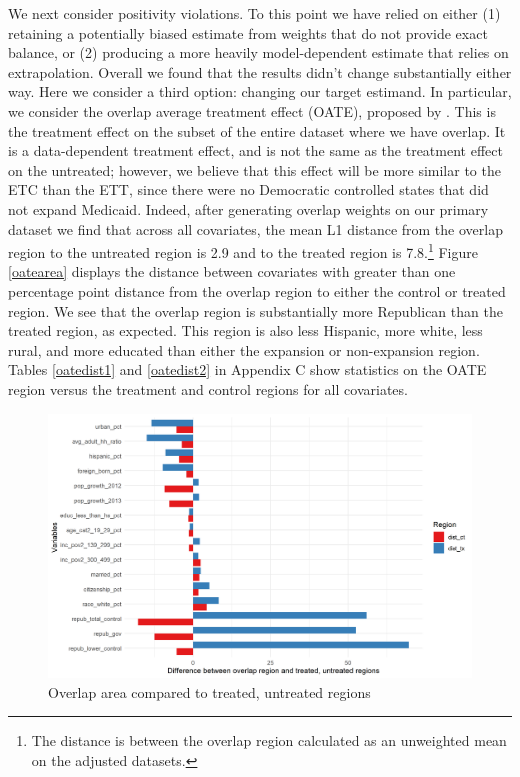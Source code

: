 \documentclass[12pt]{article}
\begin{document}
We next consider positivity violations. To this point we have relied on either (1) retaining a potentially biased estimate from weights that do not provide exact balance, or (2) producing a more heavily model-dependent estimate that relies on extrapolation. Overall we found that the results didn't change substantially either way. Here we consider a third option: changing our target estimand. In particular, we consider the overlap average treatment effect (OATE), proposed by \cite{li2018balancing}. This is the treatment effect on the subset of the entire dataset where we have overlap. It is a data-dependent treatment effect, and is not the same as the treatment effect on the untreated; however, we believe that this effect will be more similar to the ETC than the ETT, since there were no Democratic controlled states that did not expand Medicaid. Indeed, after generating overlap weights on our primary dataset we find that across all covariates, the mean L1 distance from the overlap region to the untreated region is 2.9 and to the treated region is 7.8.\footnote{The distance is between the overlap region calculated as an unweighted mean on the adjusted datasets.} Figure \ref{oatearea} displays the distance between covariates with greater than one percentage point distance from the overlap region to either the control or treated region. We see that the overlap region is substantially more Republican than the treated region, as expected. This region is also less Hispanic, more white, less rural, and more educated than either the expansion or non-expansion region. Tables \ref{oatedist1} and \ref{oatedist2} in Appendix C show statistics on the OATE region versus the treatment and control regions for all covariates.

\begin{figure}[]
\begin{center}
    \includegraphics[scale=0.6]{01_Plots/oate-imbalances.png}
    \caption{Overlap area compared to treated, untreated regions}
    \label{oateimbalance}
\end{center}
\end{figure}
\end{document}
